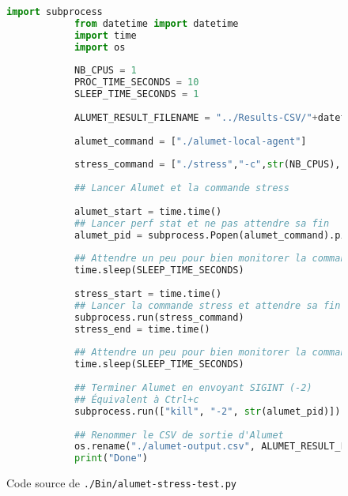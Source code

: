 \documentclass[a4paper,10pt]{article}
\begin{document}
\newpage


\begin{figure}
    \begin{jupytercode}
        \begin{lstlisting}[language=Python]
            import subprocess
            from datetime import datetime
            import time
            import os
            
            NB_CPUS = 1
            PROC_TIME_SECONDS = 10
            SLEEP_TIME_SECONDS = 1
            
            ALUMET_RESULT_FILENAME = "../Results-CSV/"+datetime.now().strftime('%Y-%m-%d_%H:%M:%S')+"_alumet-output.csv"+".csv"
            
            alumet_command = ["./alumet-local-agent"]
            
            stress_command = ["./stress","-c",str(NB_CPUS),"-t",str(PROC_TIME_SECONDS)]
            
            ## Lancer Alumet et la commande stress
            
            alumet_start = time.time()
            ## Lancer perf stat et ne pas attendre sa fin
            alumet_pid = subprocess.Popen(alumet_command).pid
            
            ## Attendre un peu pour bien monitorer la commande stress
            time.sleep(SLEEP_TIME_SECONDS)    
            
            stress_start = time.time()
            ## Lancer la commande stress et attendre sa fin
            subprocess.run(stress_command)
            stress_end = time.time()
            
            ## Attendre un peu pour bien monitorer la commande stress
            time.sleep(SLEEP_TIME_SECONDS)
            
            ## Terminer Alumet en envoyant SIGINT (-2)
            ## Équivalent à Ctrl+c
            subprocess.run(["kill", "-2", str(alumet_pid)])
            
            ## Renommer le CSV de sortie d'Alumet
            os.rename("./alumet-output.csv", ALUMET_RESULT_FILENAME)
            print("Done")
        \end{lstlisting}
        \end{jupytercode}
        \caption{Code source de \texttt{./Bin/alumet-stress-test.py}}
\end{figure}
\end{document}
